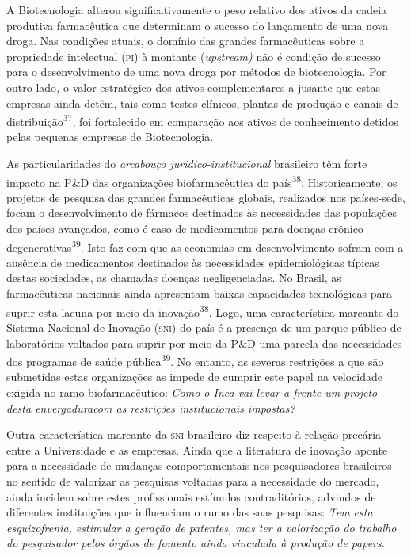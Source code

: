 \documentclass{article}
\begin{document}
A Biotecnologia alterou significativamente o peso relativo dos ativos da cadeia
produtiva farmacêutica que determinam o sucesso do lançamento de uma nova droga.
Nas condições atuais, o domínio das grandes farmacêuticas sobre a propriedade
intelectual (\textsc{pi}) à montante (\textit{upstream)}
não é condição de sucesso para o desenvolvimento de uma nova droga por métodos
de biotecnologia. Por outro lado\textit{,}
o valor estratégico dos ativos complementares a jusante que estas empresas ainda
detêm, tais como testes clínicos, plantas de produção e canais de
distribuição\textsuperscript{37}, foi fortalecido em comparação aos ativos de conhecimento detidos pelas
pequenas empresas de Biotecnologia.

As particularidades do \textit{arcabouço jurídico-institucional}
brasileiro têm forte impacto na P\&D das organizações biofarmacêutica do
país\textsuperscript{38}. Historicamente, os projetos de pesquisa das grandes farmacêuticas globais,
realizados nos países-sede, focam o desenvolvimento de fármacos destinados às
necessidades das populações dos países avançados, como é caso de medicamentos
para doenças crônico-degenerativas\textsuperscript{39}. Isto faz com que as economias em desenvolvimento sofram com a ausência de
medicamentos destinados às necessidades epidemiológicas típicas destas
sociedades, as chamadas doenças negligenciadas. No Brasil, as farmacêuticas
nacionais ainda apresentam baixas capacidades tecnológicas para suprir esta
lacuna por meio da inovação\textsuperscript{38}. Logo, uma característica marcante do Sistema Nacional de Inovação (\textsc{sni}) do
país é a presença de um parque público de laboratórios voltados para suprir por
meio da P\&D uma parcela das necessidades dos programas de saúde
pública\textsuperscript{39}. No entanto, as severas restrições a que são submetidas estas organizações as
impede de cumprir este papel na velocidade exigida no ramo biofarmacêutico:
\textit{Como o Inca vai levar a frente um projeto desta envergaduracom as
restrições institucionais impostas?}

Outra característica marcante da \textsc{sni} brasileiro diz respeito à relação precária
entre a Universidade e as empresas. Ainda que a literatura de inovação aponte
para a necessidade de mudanças comportamentais nos pesquisadores brasileiros no
sentido de valorizar as pesquisas voltadas para a necessidade do mercado, ainda
incidem sobre estes profissionais estímulos contraditórios, advindos de
diferentes instituições que influenciam o rumo das suas pesquisas: \textit{Tem
esta esquizofrenia, estimular a geração de patentes, mas ter a valorização do
trabalho do pesquisador pelos órgãos de fomento ainda vinculada à produção de
papers}.
\end{document}
